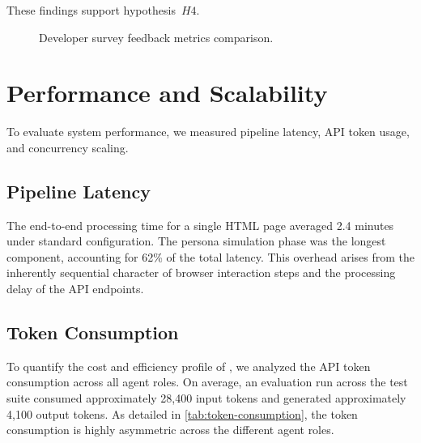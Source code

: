 These findings support hypothesis~$H4$.

\begin{figure}[ht]
  \centering
  \caption{Developer survey feedback metrics comparison.}
  \label{fig:developer-feedback-chart}
\end{figure}


\section{Performance and Scalability}
\label{sec:performance}

To evaluate system performance, we measured pipeline latency, API token usage, and concurrency scaling.

\subsection{Pipeline Latency}
\label{sec:latency}

The end-to-end processing time for a single HTML page averaged 2.4 minutes under standard configuration. The persona simulation phase was the longest component, accounting for 62\% of the total latency. This overhead arises from the inherently sequential character of browser interaction steps and the processing delay of the API endpoints.

\subsection{Token Consumption}
\label{sec:token-consumption}

To quantify the cost and efficiency profile of \versimux{}, we analyzed the API token consumption across all agent roles. On average, an evaluation run across the test suite consumed approximately 28,400 input tokens and generated approximately 4,100 output tokens. As detailed in \cref{tab:token-consumption}, the token consumption is highly asymmetric across the different agent roles.

